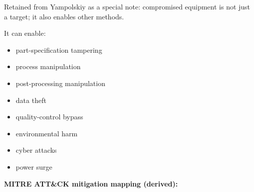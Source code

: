 \documentclass[10pt,a4paper,oneside]{report}
\begin{document}
Retained from Yampolskiy as a special note: compromised equipment is not just a target; it also enables other methods.

It can enable:

\begin{itemize}
\item part-specification tampering
\item process manipulation
\item post-processing manipulation
\item data theft
\item quality-control bypass
\item environmental harm
\item cyber attacks
\item power surge
\end{itemize}

\textbf{MITRE ATT\&CK mitigation mapping (derived):}
\end{document}
